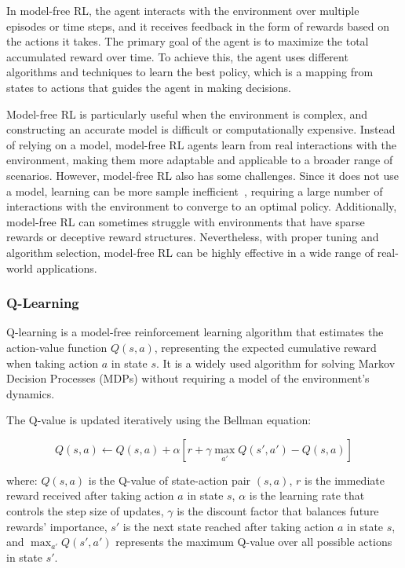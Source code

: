 In model-free RL, the agent interacts with the environment over multiple episodes or time steps, and it receives feedback in the form of rewards based on the actions it takes. The primary goal of the agent is to maximize the total accumulated reward over time. To achieve this, the agent uses different algorithms and techniques to learn the best policy, which is a mapping from states to actions that guides the agent in making decisions.

Model-free RL is particularly useful when the environment is complex, and constructing an accurate model is difficult or computationally expensive.
Instead of relying on a model, model-free RL agents learn from real interactions with the environment, making them more adaptable and applicable to a broader range of scenarios.
However, model-free RL also has some challenges. Since it does not use a model, learning can be more sample inefficient~\cite{sutton2018reinforcement}, requiring a large number of interactions with the environment to converge to an optimal policy. Additionally, model-free RL can sometimes struggle with environments that have sparse rewards or deceptive reward structures. Nevertheless, with proper tuning and algorithm selection, model-free RL can be highly effective in a wide range of real-world applications.
\subsubsection{Q-Learning}\label{subsubsec:q-learning}

Q-learning is a model-free reinforcement learning algorithm that estimates the action-value function \(Q(s, a)\), representing the expected cumulative reward when taking action \(a\) in state \(s\). It is a widely used algorithm for solving Markov Decision Processes (MDPs) without requiring a model of the environment's dynamics.

The Q-value is updated iteratively using the Bellman equation:

\[Q(s, a) \leftarrow Q(s, a) + \alpha \left[ r + \gamma \max_{a'} Q(s', a') - Q(s, a) \right]\]

where:
\(Q(s, a)\) is the Q-value of state-action pair \((s, a)\),
\(r\) is the immediate reward received after taking action \(a\) in state \(s\),
\(\alpha\) is the learning rate that controls the step size of updates,
\(\gamma\) is the discount factor that balances future rewards' importance,
\(s'\) is the next state reached after taking action \(a\) in state \(s\), and
\(\max_{a'} Q(s', a')\) represents the maximum Q-value over all possible actions in state \(s'\).

